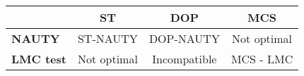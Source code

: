 \begin{table}[htbp]
  \centering
    \begin{tabular}{lccc}
      & \multicolumn{1}{c}{\textbf{ST}} & \multicolumn{1}{c}{\textbf{DOP}} & \multicolumn{1}{c}{\textbf{MCS}} \\
    \midrule
    \textbf{NAUTY} & ST-NAUTY & DOP-NAUTY & \textcolor[rgb]{ 1,  0,  0}{Not optimal} \\
    \textbf{LMC test} & \textcolor[rgb]{ 1,  0,  0}{Not optimal} & \textcolor[rgb]{ 1,  0,  0}{Incompatible} & MCS - LMC \\
    \bottomrule
    \end{tabular}%
  \label{tab:selected_procedures}%
\end{table}%
